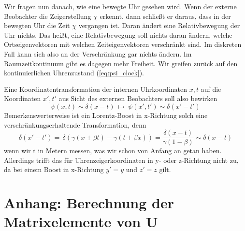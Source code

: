 \documentclass[12pt]{article}
\begin{document}
Wir fragen nun danach, wie eine bewegte Uhr gesehen wird. Wenn der externe Beobachter die Zeigerstellung $\chi$ erkennt, dann schließt er daraus, dass in der bewegten Uhr die Zeit $\chi$ vergangen ist. Daran ändert eine Relativbewegung der Uhr nichts. Das heißt, eine Relativbewegung soll nichts daran ändern, welche Ortseigenvektoren mit welchen Zeiteigenvektoren verschränkt sind. Im diskreten Fall kann sich also an der Verschränkung gar nichts ändern. Im Raumzeitkontinuum gibt es dagegen mehr Freiheit. Wir greifen zurück auf den kontinuierlichen Uhrenzustand (\ref{eq:psi_clock}). 

Eine Koordinatentransformation der internen Uhrkoordinaten $x,t$ auf die Koordinaten $x',t'$ aus Sicht des externen Beobachters soll also bewirken
\begin{equation} 
\psi(x,t) \sim \delta(x-t)\ \longmapsto \ \psi(x',t') \sim \delta(x'-t')
\end{equation} 
Bemerkenswerterweise ist ein Lorentz-Boost in x-Richtung solch eine verschränkungserhaltende Transformation, denn
\begin{equation} 
\delta(x'-t') =\, \delta(\gamma (x + \beta t) - \gamma (t + \beta x)) 
= \frac{\delta(x-t)}{\gamma (1-\beta)} \sim \delta(x-t)
\end{equation}
wenn wir t in Metern messen, was wir schon von Anfang an getan haben. Allerdings trifft das für Uhrenzeigerkoordinaten in y- oder z-Richtung nicht zu, da bei einem Boost in x-Richtung $y'=y$ und $z'=z$ gilt.

\section{Anhang: Berechnung der Matrixelemente von U}
\end{document}
